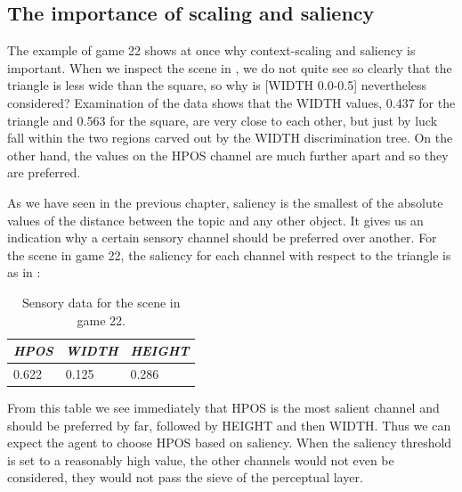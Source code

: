 \subsection{The importance of scaling and saliency}

The example of game 22 shows at once why context-scaling 
and saliency is important. When we inspect the scene in 
, we do not quite see so clearly 
that the triangle is less wide than the square, so why
is [WIDTH 0.0-0.5] 
nevertheless considered? Examination of the data shows
that the WIDTH values, 0.437 for the triangle
and 0.563 for the square, are very close 
to each other, but just by luck fall within 
the two regions carved out by the WIDTH discrimination
tree. On the other hand, the values on the HPOS channel 
are much further apart and so they are preferred. 

As we have seen in the previous chapter, 
saliency is the smallest of the absolute values     
of the distance between the topic and any
other object. It gives us an indication why 
a certain sensory channel should be preferred
over another. For the scene in game 22, the saliency for each channel with 
respect to the triangle is as in : 
\begin{table}
\begin{center}
\begin{tabular}{ l  l  l } \hline
{\it HPOS} & {\it WIDTH} & {\it HEIGHT} \\ \hline
 0.622 & 0.125 & 0.286  \\ \hline
\end{tabular}
\caption{\label{tab:t-game22-sal} Sensory data for the scene in game 22.}
\end{center}
\end{table}
From this table we see immediately that HPOS is the 
most salient channel and should be preferred by far, followed
by HEIGHT and then WIDTH. Thus we can expect the
agent to choose HPOS based on saliency. When the saliency threshold
is set to a reasonably high value, the other channels
would not even be considered, they would not pass the 
sieve of the perceptual layer. 

